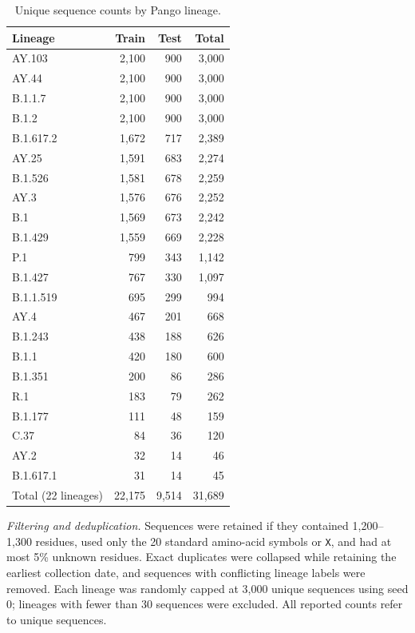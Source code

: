 \documentclass[conference]{IEEEtran}
\begin{document}
\begin{table}[!t]
    \centering
    \caption{Unique sequence counts by Pango lineage.}
    \label{tab:lineage-frequency}
    \small
    \setlength{\tabcolsep}{0pt}
    \renewcommand{\arraystretch}{1.15}
    \begin{tabular*}{\columnwidth}{@{\extracolsep{\fill}}lrrr@{}}
        \toprule
        Lineage & Train & Test & Total \\
        \midrule
        AY.103    & 2,100 & 900 & 3,000 \\
        AY.44     & 2,100 & 900 & 3,000 \\
        B.1.1.7   & 2,100 & 900 & 3,000 \\
        B.1.2     & 2,100 & 900 & 3,000 \\
        B.1.617.2 & 1,672 & 717 & 2,389 \\
        AY.25     & 1,591 & 683 & 2,274 \\
        B.1.526   & 1,581 & 678 & 2,259 \\
        AY.3      & 1,576 & 676 & 2,252 \\
        B.1       & 1,569 & 673 & 2,242 \\
        B.1.429   & 1,559 & 669 & 2,228 \\
        P.1       & 799 & 343 & 1,142 \\
        B.1.427   & 767 & 330 & 1,097 \\
        B.1.1.519 & 695 & 299 & 994 \\
        AY.4      & 467 & 201 & 668 \\
        B.1.243   & 438 & 188 & 626 \\
        B.1.1     & 420 & 180 & 600 \\
        B.1.351   & 200 & 86 & 286 \\
        R.1       & 183 & 79 & 262 \\
        B.1.177   & 111 & 48 & 159 \\
        C.37      & 84 & 36 & 120 \\
        AY.2      & 32 & 14 & 46 \\
        B.1.617.1 & 31 & 14 & 45 \\
        \midrule
        Total (22 lineages) & 22,175 & 9,514 & 31,689 \\
        \bottomrule
    \end{tabular*}
\end{table}

\textit{Filtering and deduplication.} Sequences were retained if they contained 1,200--1,300 residues, used only the 20 standard amino-acid symbols or \texttt{X}, and had at most 5\% unknown residues. Exact duplicates were collapsed while retaining the earliest collection date, and sequences with conflicting lineage labels were removed. Each lineage was randomly capped at 3,000 unique sequences using seed 0; lineages with fewer than 30 sequences were excluded. All reported counts refer to unique sequences.
\end{document}
